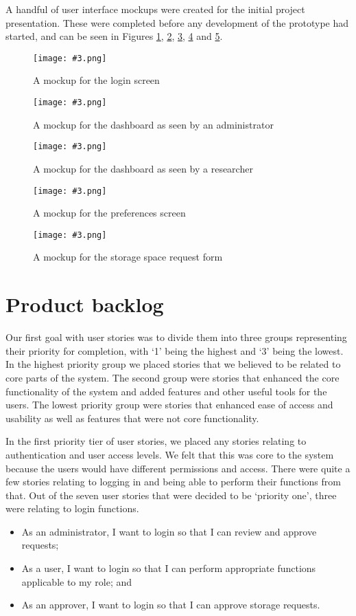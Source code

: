 \documentclass[a4paper,titlepage,12pt]{article}
\let\stdsection\section
\renewcommand\section{\newpage\stdsection}
\newcommand\figimg[4][\textwidth]{
	\begin{figure}
		\caption{#4}
		\label{fig:#2}
		\texttt{[image: \#3.png]}
	\end{figure}
}
\begin{document}
A handful of user interface mockups were created for the initial project
presentation. These were completed before any development of the prototype had
started, and can be seen in Figures \ref{fig:login-mockup},
\ref{fig:admin-mockup}, \ref{fig:researcher-mockup},
\ref{fig:preferences-mockup} and \ref{fig:request-mockup}.

\figimg{login-mockup}{../mockups/login}
	{A mockup for the login screen}

\figimg{admin-mockup}{../mockups/admin}
	{A mockup for the dashboard as seen by an administrator}

\figimg{researcher-mockup}{../mockups/researcher}
	{A mockup for the dashboard as seen by a researcher}

\figimg{preferences-mockup}{../mockups/preferences}
	{A mockup for the preferences screen}

\figimg{request-mockup}{../mockups/request}
	{A mockup for the storage space request form}

\section{Product backlog}

Our first goal with user stories was to divide them into three groups
representing their priority for completion, with `1' being the highest and `3'
being the lowest. In the highest priority group we placed stories that we
believed to be related to core parts of the system. The second group were
stories that enhanced the core functionality of the system and added features
and other useful tools for the users. The lowest priority group were stories
that enhanced ease of access and usability as well as features that were not
core functionality.

In the first priority tier of user stories, we placed any stories relating to
authentication and user access levels. We felt that this was core to the system
because the users would have different permissions and access. There were quite
a few stories relating to logging in and being able to perform their functions
from that. Out of the seven user stories that were decided to be `priority
one', three were relating to login functions.

\begin{itemize}
	\item As an administrator, I want to login so that I can review and
	      approve requests;
	\item As a user, I want to login so that I can perform appropriate
	      functions applicable to my role; and
	\item As an approver, I want to login so that I can approve storage
	      requests.
\end{itemize}
\end{document}

